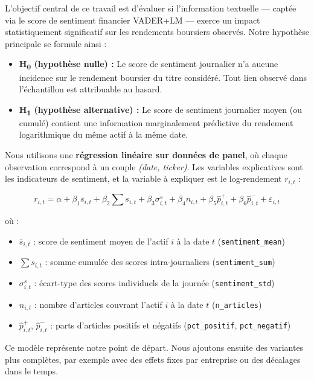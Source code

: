 \documentclass[11pt,a4paper]{article}
\begin{document}
L'objectif central de ce travail est d'évaluer si l'information textuelle --- captée via le score de sentiment financier VADER+LM --- exerce un impact statistiquement significatif sur les rendements boursiers observés. Notre hypothèse principale se formule ainsi :

\begin{itemize}
    \item \textbf{H\textsubscript{0} (hypothèse nulle) :} Le score de sentiment journalier n'a aucune incidence sur le rendement boursier du titre considéré. Tout lien observé dans l'échantillon est attribuable au hasard.
    \item \textbf{H\textsubscript{1} (hypothèse alternative) :} Le score de sentiment journalier moyen (ou cumulé) contient une information marginalement prédictive du rendement logarithmique du même actif à la même date.
\end{itemize}

Nous utilisons une \textbf{régression linéaire sur données de panel}, où chaque observation correspond à un couple \textit{(date, ticker)}. Les variables explicatives sont les indicateurs de sentiment, et la variable à expliquer est le log-rendement $r_{i,t}$ :

$$r_{i,t} = \alpha + \beta_1 \overline{s}_{i,t} + \beta_2 \sum s_{i,t} + \beta_3 \sigma^s_{i,t} + \beta_4 n_{i,t} + \beta_5 \hat{p}^+_{i,t} + \beta_6 \hat{p}^-_{i,t} + \varepsilon_{i,t}$$

où :
\begin{itemize}
    \item $\overline{s}_{i,t}$ : score de sentiment moyen de l'actif $i$ à la date $t$ (\texttt{sentiment\_mean})
    \item $\sum s_{i,t}$ : somme cumulée des scores intra-journaliers (\texttt{sentiment\_sum})
    \item $\sigma^s_{i,t}$ : écart-type des scores individuels de la journée (\texttt{sentiment\_std})
    \item $n_{i,t}$ : nombre d'articles couvrant l'actif $i$ à la date $t$ (\texttt{n\_articles})
    \item $\hat{p}^+_{i,t}$, $\hat{p}^-_{i,t}$ : parts d'articles positifs et négatifs (\texttt{pct\_positif}, \texttt{pct\_negatif})
\end{itemize}

Ce modèle représente notre point de départ. Nous ajoutons ensuite des variantes plus complètes, par exemple avec des effets fixes par entreprise ou des décalages dans le temps.
\end{document}
